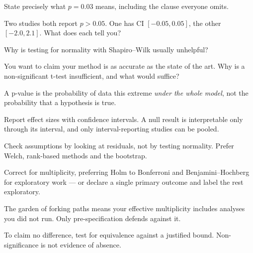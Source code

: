 \begin{checkpoint}
\begin{tightnum}
  \item State precisely what $p = 0.03$ means, including the clause everyone
    omits.
  \item Two studies both report $p > 0.05$. One has CI $[-0.05, 0.05]$, the
    other $[-2.0, 2.1]$. What does each tell you?
  \item Why is testing for normality with Shapiro--Wilk usually unhelpful?
  \item You want to claim your method is as accurate as the state of the art.
    Why is a non-significant t-test insufficient, and what would suffice?
\end{tightnum}
\end{checkpoint}

\begin{chaptersummary}
\begin{tight}
  \item A p-value is the probability of data this extreme \emph{under the whole
    model}, not the probability that a hypothesis is true.
  \item Report effect sizes with confidence intervals. A null result is
    interpretable only through its interval, and only interval-reporting
    studies can be pooled.
  \item Check assumptions by looking at residuals, not by testing normality.
    Prefer Welch, rank-based methods and the bootstrap.
  \item Correct for multiplicity, preferring Holm to Bonferroni and
    Benjamini--Hochberg for exploratory work --- or declare a single primary
    outcome and label the rest exploratory.
  \item The garden of forking paths means your effective multiplicity includes
    analyses you did not run. Only pre-specification defends against it.
  \item To claim no difference, test for equivalence against a justified bound.
    Non-significance is not evidence of absence.
\end{tight}
\end{chaptersummary}

